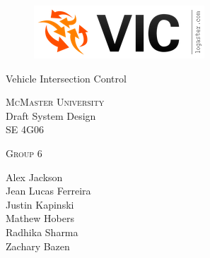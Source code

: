 \documentclass [11pt]{article}
\begin{document}
\begin {center} 

\thispagestyle{empty}
\vspace*{5cm}

\begin {figure}[h!]
\centering
\hspace{-10mm}\includegraphics [scale = .5, trim={.4cm 0 .8cm 0},clip] {figures/vic_logo.png}
\end {figure}

{\fontfamily{\cabinfamily}\selectfont
\Huge{Vehicle Intersection Control} }

\vspace{1 cm}
{\Large{\textsc{McMaster University}}\\}  \vspace {1cm}
{\large Draft System Design\\ \vspace {0.4 cm} SE 4G06}  \vspace {1cm}

{\large \textsc{Group 6} \\} \vspace{1cm}

{
Alex Jackson \\
Jean Lucas Ferreira \\
Justin Kapinski\\
Mathew Hobers\\
Radhika Sharma\\
Zachary Bazen}




\end{center}


\pagebreak


\tableofcontents
\listoftables
\listoffigures



\pagebreak


\thispagestyle{empty}
\end{document}
